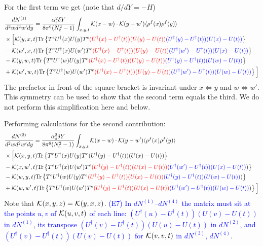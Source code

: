 \documentclass[10pt]{article}
\numberwithin{equation}{section}
\begin{document}
For the first term we get (note that $d/dY = - H$)
\begin{align}
    &\frac{dN^{(1)}}{d^2 w d^2 w' d y} = \frac{\alpha_s^2 \delta Y}{8 \pi^6 (N_c^2-1)}
\int_{x,y,t} {\cal K}(x-w)\cdot {\cal K}(y-w') \langle\rho^f(x) \rho^f(y) \rangle \notag \\ & \times  
\Big[ 
 {\cal K}(y,x,t) {\rm Tr} \left\{ T^e U^\dagger(x) U(y) T^e \textcolor{red}{( U^\dagger(x) - U^\dagger(t) )  ( U(y) - U(t) )}\textcolor{blue}{( U^\dagger(y) - U^\dagger(t) )  ( U(x) - U(t) )}\right\}
 \notag \\ & -  {\cal K}(w',x,t) {\rm Tr} \left\{ T^e U^\dagger(x) U(w') T^e \textcolor{red}{( U^\dagger(x) - U^\dagger(t) )  ( U(y) - U(t) )}\textcolor{blue}{( U^\dagger(w') - U^\dagger(t) )  ( U(x) - U(t) )}\right\}
 \notag \\ & -  {\cal K}(y,w,t) {\rm Tr} \left\{ T^e U^\dagger(w) U(y) T^e \textcolor{red}{( U^\dagger(x) - U^\dagger(t) )  ( U(y) - U(t) )}\textcolor{blue}{( U^\dagger(y) - U^\dagger(t) )  ( U(w) - U(t) )}\right\}
 \notag \\ & +  {\cal K}(w',w,t) {\rm Tr} \left\{ T^e U^\dagger(w) U(w') T^e \textcolor{red}{( U^\dagger(x) - U^\dagger(t) )  ( U(y) - U(t) )}\textcolor{blue}{( U^\dagger(w') - U^\dagger(t) )  ( U(w) - U(t) )}\right\}
\Big] 
\end{align}
The prefactor in front of the square bracket is invariant under $ x \Leftrightarrow y $ and $ w \Leftrightarrow w' $.  This symmetry can be used to show that the second term equals the third. We do not perform this simplification here and below. 

Performing calculations for the second contribution: 
\begin{align}
    &\frac{dN^{(2)}}{d^2 w d^2 w' d y} = \frac{\alpha_s^2 \delta Y}{8 \pi^6 (N_c^2-1)}
\int_{x,y,t} {\cal K}(x-w)\cdot {\cal K}(y-w') \langle\rho^f(x) \rho^f(y) \rangle \notag \\ & \times  
\Big[ 
 {\cal K}(x,y,t) {\rm Tr} \left\{ T^e U^\dagger(x) U(y) T^e ( U^\dagger(y) - U^\dagger(t) )  ( U(x) - U(t) )\right\}
 \notag \\ & -  {\cal K}(x, w',t) {\rm Tr} \left\{ T^e U^\dagger(x) U(w') T^e \textcolor{red}{( U^\dagger(y) - U^\dagger(t) )  ( U(x) - U(t) )}\textcolor{blue}{( U^\dagger(w') - U^\dagger(t) )  ( U(x) - U(t) )})\right\}
 \notag \\ & -  {\cal K}(w,y,t) {\rm Tr} \left\{ T^e U^\dagger(w) U(y) T^e \textcolor{red}{( U^\dagger(y) - U^\dagger(t) )  ( U(x) - U(t) )}\textcolor{blue}{( U^\dagger(y) - U^\dagger(t) )  ( U(w) - U(t) )} )\right\}
 \notag \\ & +  {\cal K}(w, w',t) {\rm Tr} \left\{ T^e U^\dagger(w) U(w') T^e \textcolor{red}{( U^\dagger(y) - U^\dagger(t) )  ( U(x) - U(t) )}\textcolor{blue}{( U^\dagger(w') - U^\dagger(t) )  ( U(w) - U(t) )} )\right\}
\Big] 
\end{align} 
Note that ${\cal K}(x,y,z) = {\cal K}(y,x,z)$. \textcolor{blue}{(E7) In $dN^{(1)}$--$dN^{(4)}$ the matrix must sit at the points $u,v$ of ${\cal K}(u,v,t)$ of each line: $(U^\dagger(u)-U^\dagger(t))(U(v)-U(t))$ in $dN^{(1)}$, its transpose $(U^\dagger(v)-U^\dagger(t))(U(u)-U(t))$ in $dN^{(2)}$, and $(U^\dagger(v)-U^\dagger(t))(U(v)-U(t))$ for ${\cal K}(v,v,t)$ in $dN^{(3)}$, $dN^{(4)}$.} 
\end{document}
